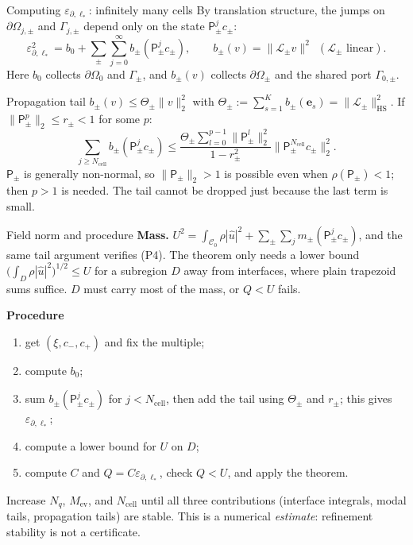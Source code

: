\documentclass[aspectratio=169]{beamer}
\newcommand{\eps}{\varepsilon_{\partial,\ell_*}}
\begin{document}
\begin{frame}{Computing $\eps$: infinitely many cells}
  \small
  By translation structure, the jumps on $\partial\Omega_{j,\pm}$ and $\Gamma_{j,\pm}$
  depend only on the state $\mathsf P_\pm^jc_\pm$:
  \[
    \eps^2=b_0+\sum_\pm\sum_{j=0}^\infty b_\pm(\mathsf P_\pm^jc_\pm),\qquad
    b_\pm(v)=\lVert\mathcal L_\pm v\rVert^2\ \ (\mathcal L_\pm\text{ linear}).
  \]
  Here $b_0$ collects $\partial\Omega_0$ and $\Gamma_\pm$, and $b_\pm(v)$ collects
  $\partial\Omega_\pm$ and the shared port $\Gamma_{0,\pm}$.

  \begin{block}{Propagation tail}
    $b_\pm(v)\le\Theta_\pm\lVert v\rVert_2^2$ with $\Theta_\pm:=\sum_{s=1}^Kb_\pm(\boldsymbol e_s)=\lVert\mathcal L_\pm\rVert_{\mathrm{HS}}^2$. If
    $\lVert\mathsf P_\pm^p\rVert_2\le r_\pm<1$ for some $p$:
    \[
      \sum_{j\ge N_{\mathrm{cell}}}b_\pm(\mathsf P_\pm^jc_\pm)\le
      \frac{\Theta_\pm\sum_{l=0}^{p-1}\lVert\mathsf P_\pm^l\rVert_2^2}{1-r_\pm^2}
      \bigl\lVert\mathsf P_\pm^{N_{\mathrm{cell}}}c_\pm\bigr\rVert_2^2.
    \]
    $\mathsf P_\pm$ is generally non-normal, so $\lVert\mathsf P_\pm\rVert_2>1$ is possible
    even when $\rho(\mathsf P_\pm)<1$; then $p>1$ is needed. The tail cannot be dropped
    just because the last term is small.
  \end{block}
\end{frame}

\begin{frame}{Field norm and procedure}
  \small
  \textbf{Mass.} $U^2=\int_{\mathcal C_0}\rho|\widehat u|^2+\sum_\pm\sum_jm_\pm(\mathsf P_\pm^jc_\pm)$,
  and the same tail argument verifies (P4). The theorem only needs a lower bound
  $\bigl(\int_D\rho|\widehat u|^2\bigr)^{1/2}\le U$ for a subregion $D$ away from
  interfaces, where plain trapezoid sums suffice. $D$ must carry most of the mass, or
  $Q<U$ fails.

  \medskip
  \textbf{Procedure}
      \begin{enumerate}
        \item get $(\xi,c_-,c_+)$ and fix the multiple;
        \item compute $b_0$;
        \item sum $b_\pm(\mathsf P_\pm^jc_\pm)$ for $j<N_{\mathrm{cell}}$, then add the
          tail using $\Theta_\pm$ and $r_\pm$; this gives $\eps$;
        \item compute a lower bound for $U$ on $D$;
        \item compute $C$ and $Q=C\eps$, check $Q<U$, and apply the theorem.
      \end{enumerate}
      Increase $N_q$, $M_{\mathrm{ev}}$, and $N_{\mathrm{cell}}$ until all three
      contributions (interface integrals, modal tails, propagation tails) are stable.
      This is a numerical \emph{estimate}: refinement stability is not a certificate.
\end{frame}
\end{document}
